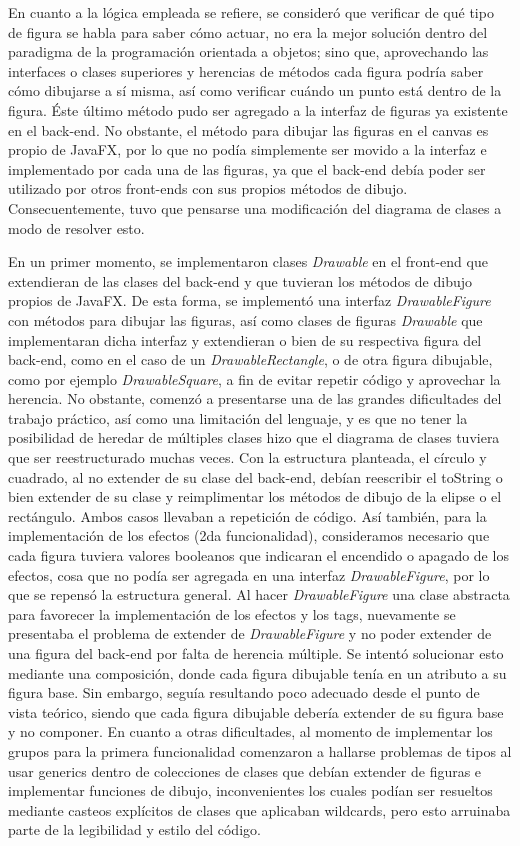 \documentclass[12pt]{article}
\begin{document}
En cuanto a la lógica empleada se refiere, se consideró que verificar de qué tipo de figura se habla para saber cómo actuar, no era la mejor solución dentro del paradigma de la programación orientada a objetos; sino que, aprovechando las interfaces o clases superiores y herencias de métodos cada figura podría saber cómo dibujarse a sí misma, así como verificar cuándo un punto está dentro de la figura. Éste último método pudo ser agregado a la interfaz de figuras ya existente en el back-end. No obstante, el método para dibujar las figuras en el canvas es propio de JavaFX, por lo que no podía simplemente ser movido a la interfaz e implementado por cada una de las figuras, ya que el back-end debía poder ser utilizado por otros front-ends con sus propios métodos de dibujo. Consecuentemente, tuvo que pensarse una modificación del diagrama de clases a modo de resolver esto.

En un primer momento, se implementaron clases \textit{Drawable} en el front-end que extendieran de las clases del back-end y que tuvieran los métodos de dibujo propios de JavaFX. De esta forma, se implementó una interfaz \textit{DrawableFigure} con métodos para dibujar las figuras, así como clases de figuras \textit{Drawable} que implementaran dicha interfaz y extendieran o bien de su respectiva figura del back-end, como en el caso de un \textit{DrawableRectangle}, o de otra figura dibujable, como por ejemplo \textit{DrawableSquare}, a fin de evitar repetir código y aprovechar la herencia. No obstante, comenzó a presentarse una de las grandes dificultades del trabajo práctico, así como una limitación del lenguaje, y es que no tener la posibilidad de heredar de múltiples clases hizo que el diagrama de clases tuviera que ser reestructurado muchas veces. Con la estructura planteada, el círculo y cuadrado, al no extender de su clase del back-end, debían reescribir el toString o bien extender de su clase y reimplimentar los métodos de dibujo de la elipse o el rectángulo. Ambos casos llevaban a repetición de código. Así también, para la implementación de los efectos (2da funcionalidad), consideramos necesario que cada figura tuviera valores booleanos que indicaran el encendido o apagado de los efectos, cosa que no podía ser agregada en una interfaz \textit{DrawableFigure}, por lo que se repensó la estructura general. Al hacer \textit{DrawableFigure} una clase abstracta para favorecer la implementación de los efectos y los tags, nuevamente se presentaba el problema de extender de \textit{DrawableFigure} y no poder extender de una figura del back-end por falta de herencia múltiple. Se intentó solucionar esto mediante una composición, donde cada figura dibujable tenía en un atributo a su figura base. Sin embargo, seguía resultando poco adecuado desde el punto de vista teórico, siendo que cada figura dibujable debería extender de su figura base y no componer. En cuanto a otras dificultades, al momento de implementar los grupos para la primera funcionalidad comenzaron a hallarse problemas de tipos al usar generics dentro de colecciones de clases que debían extender de figuras e implementar funciones de dibujo, inconvenientes los cuales podían ser resueltos mediante casteos explícitos de clases que aplicaban wildcards, pero esto arruinaba parte de la legibilidad y estilo del código. 
\end{document}
